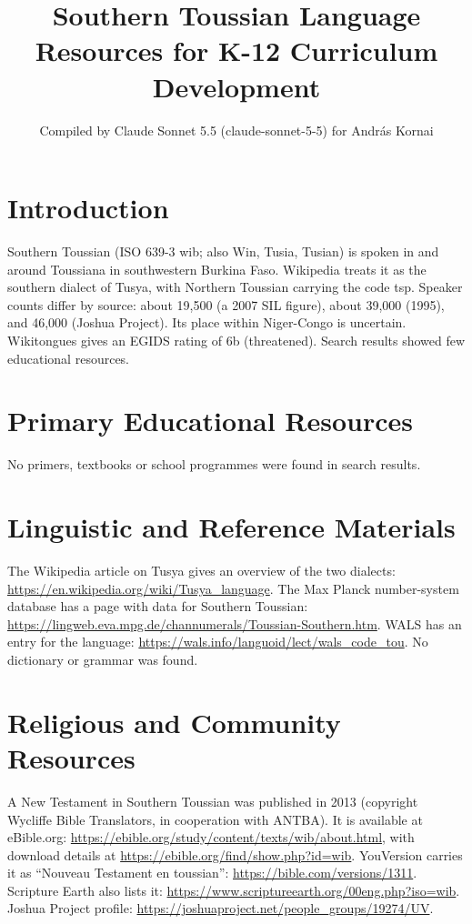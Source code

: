 \documentclass[12pt]{article}
\title{Southern Toussian Language Resources for K-12 Curriculum Development}
\author{Compiled by Claude Sonnet 5.5 (claude-sonnet-5-5) for Andr\'as Kornai}
\date{}
\begin{document}
\maketitle

\section{Introduction}
Southern Toussian (ISO 639-3 wib; also Win, Tusia, Tusian) is spoken in and around Toussiana in southwestern Burkina Faso. Wikipedia treats it as the southern dialect of Tusya, with Northern Toussian carrying the code tsp. Speaker counts differ by source: about 19,500 (a 2007 SIL figure), about 39,000 (1995), and 46,000 (Joshua Project). Its place within Niger-Congo is uncertain. Wikitongues gives an EGIDS rating of 6b (threatened). Search results showed few educational resources.

\section{Primary Educational Resources}
No primers, textbooks or school programmes were found in search results.

\section{Linguistic and Reference Materials}
The Wikipedia article on Tusya gives an overview of the two dialects: \url{https://en.wikipedia.org/wiki/Tusya_language}.
The Max Planck number-system database has a page with data for Southern Toussian: \url{https://lingweb.eva.mpg.de/channumerals/Toussian-Southern.htm}.
WALS has an entry for the language: \url{https://wals.info/languoid/lect/wals_code_tou}.
No dictionary or grammar was found.

\section{Religious and Community Resources}
A New Testament in Southern Toussian was published in 2013 (copyright Wycliffe Bible Translators, in cooperation with ANTBA). It is available at eBible.org: \url{https://ebible.org/study/content/texts/wib/about.html}, with download details at \url{https://ebible.org/find/show.php?id=wib}. YouVersion carries it as ``Nouveau Testament en toussian'': \url{https://bible.com/versions/1311}.
Scripture Earth also lists it: \url{https://www.scriptureearth.org/00eng.php?iso=wib}.
Joshua Project profile: \url{https://joshuaproject.net/people_groups/19274/UV}.
\end{document}
